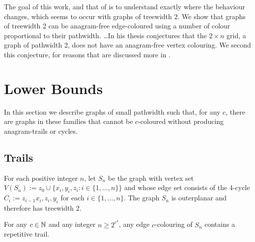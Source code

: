 \documentclass[kpfonts]{patmorin}
\DeclareMathOperator{\ci}{\overline{\pi}}
\begin{document}
The goal of this work, and that of \cite{carmi.dujmovic.ea:anagram-free} is to understand exactly where the behaviour changes, which seems to occur with graphs of treewidth $2$.  We show that graphs of treewidth 2 can be anagram-free edge-coloured using a number of colour proportional to their pathwidth.  \ldots  In his thesis \citet{wilson:thesis} conjectures that the $2\times n$ grid, a graph of pathwidth 2, does not have an anagram-free vertex colouring.  We second this conjecture, for reasons that are discussed more in .











\section{Lower Bounds}

In this section we describe graphs of small pathwidth such that, for any $c$, there are graphs in these families that cannot be $c$-coloured without producing anagram-trails or cycles.

\subsection{Trails}

For each positive integer $n$, let $S_n$ be the graph with vertex set $V(S_n):=z_0\cup\{x_i,y_i,z_i:i\in\{1,\ldots,n\}\}$ and whose edge set consists of the 4-cycle $C_i:=z_{i-1}x_i,z_i,y_i$ for each $i\in\{1,\ldots,n\}$.  The graph $S_n$ is outerplanar and therefore has treewidth 2.

\begin{lem}
    For any $c\in\mathbb{N}$ and any integer $n\ge 2^{c^4}$, any edge $c$-colouring of $S_n$ contains a repetitive trail.
\end{lem}
\end{document}
